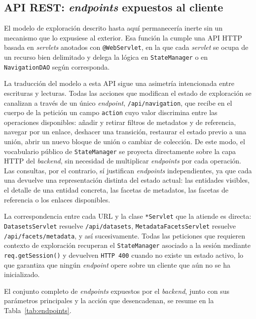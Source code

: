     \subsection{API REST: \textit{endpoints} expuestos al cliente}
    \label{subsec:endpoints}

El modelo de exploración descrito hasta aquí permanecería inerte sin
un mecanismo que lo expusiese al exterior. Esa función la cumple una
API HTTP basada en \textit{servlets} anotados con \texttt{@WebServlet},
en la que cada \textit{servlet} se ocupa de un recurso bien delimitado
y delega la lógica en \texttt{StateManager} o en \texttt{NavigationDAO}
según corresponda.

La traducción del modelo a esta API sigue una asimetría intencionada
entre escrituras y lecturas. Todas las acciones que modifican el
estado de exploración se canalizan a través de un único
\textit{endpoint}, \texttt{/api/navigation}, que recibe en el cuerpo
de la petición un campo \texttt{action} cuyo valor discrimina entre
las operaciones disponibles: añadir y retirar filtros de metadatos y
de referencia, navegar por un enlace, deshacer una transición,
restaurar el estado previo a una unión, abrir un nuevo bloque de
unión o cambiar de colección. De este modo, el vocabulario público
de \texttt{StateManager} se proyecta directamente sobre la capa
HTTP del \textit{backend}, sin necesidad de multiplicar \textit{endpoints} por
cada operación. Las consultas, por el contrario, sí justifican
\textit{endpoints} independientes, ya que cada una devuelve una
representación distinta del estado actual: las entidades visibles,
el detalle de una entidad concreta, las facetas de metadatos, las
facetas de referencia o los enlaces disponibles.

La correspondencia entre cada URL y la clase \texttt{*Servlet} que la
atiende es directa: \texttt{DatasetsServlet} resuelve
\texttt{/api/datasets}, \texttt{MetadataFacetsServlet} resuelve
\texttt{/api/facets/metadata}, y así sucesivamente. Todas las
peticiones que requieren contexto de exploración recuperan el
\texttt{StateManager} asociado a la sesión mediante
\texttt{req.getSession()} y devuelven \texttt{HTTP 400} cuando no
existe un estado activo, lo que garantiza que ningún \textit{endpoint}
opere sobre un cliente que aún no se ha inicializado.

El conjunto completo de \textit{endpoints} expuestos por el \textit{backend},
junto con sus parámetros principales y la acción que desencadenan, se
resume en la Tabla~\ref{tab:endpoints}.


